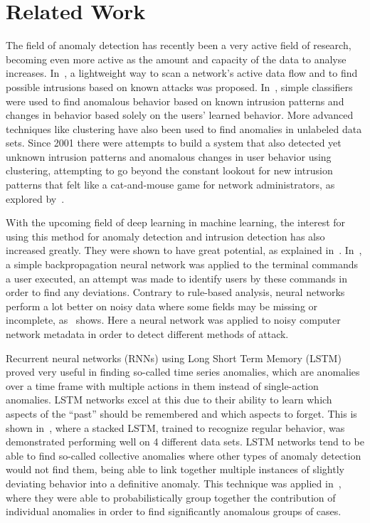 \chapter{Related Work}\label{ch:related_work}

The field of anomaly detection has recently been a very active field of research, becoming even more active as the amount and capacity of the data to analyse increases. In~\cite{roesch1999snort}, a lightweight way to scan a network's active data flow and to find possible intrusions based on known attacks was proposed. In~\cite{lee1998data}, simple classifiers were used to find anomalous behavior based on known intrusion patterns and changes in behavior based solely on the users' learned behavior. More advanced techniques like clustering have also been used to find anomalies in unlabeled data sets. Since 2001 there were attempts to build a system that also detected yet unknown intrusion patterns and anomalous changes in user behavior using clustering, attempting to go beyond the constant lookout for new intrusion patterns that felt like a cat-and-mouse game for network administrators, as explored by~\cite{Portnoy01intrusiondetection}.

With the upcoming field of deep learning in machine learning, the interest for using this method for anomaly detection and intrusion detection has also increased greatly. They were shown to have great potential, as explained in~\cite{lecun2015deep}. In~\cite{ryan1998intrusion}, a simple backpropagation neural network was applied to the terminal commands a user executed, an attempt was made to identify users by these commands in order to find any deviations. Contrary to rule-based analysis, neural networks perform a lot better on noisy data where some fields may be missing or incomplete, as~\cite{cannady1998artificial} shows. Here a neural network was applied to noisy computer network metadata in order to detect different methods of attack.

Recurrent neural networks (RNNs) using Long Short Term Memory (LSTM) proved very useful in finding so-called time series anomalies, which are anomalies over a time frame with multiple actions in them instead of single-action anomalies. LSTM networks excel at this due to their ability to learn which aspects of the \enquote{past} should be remembered and which aspects to forget. This is shown in~\cite{malhotra2015long}, where a stacked LSTM, trained to recognize regular behavior, was demonstrated performing well on 4 different data sets. LSTM networks tend to be able to find so-called collective anomalies where other types of anomaly detection would not find them, being able to link together multiple instances of slightly deviating behavior into a definitive anomaly. This technique was applied in~\cite{olsson2015probabilistic}, where they were able to probabilistically group together the contribution of individual anomalies in order to find significantly anomalous groups of cases.